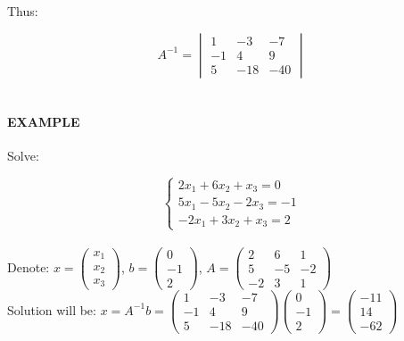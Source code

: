 \documentclass[]{article}
\let\oldparagraph\paragraph
\renewcommand{\paragraph}[1]{\oldparagraph{#1}\mbox{}}
\begin{document}
Thus:\\
 \hspace{2cm}

\[A^{-1}=\begin{vmatrix} 1 &   -3 &   -7\\ -1 &   4 &   9 \\ 5 &   -18 &   -40 \end{vmatrix}\]\\
 \newpage

\paragraph{\texorpdfstring{EXAMPLE\\
}{EXAMPLE }}\label{example-12}

Solve:

\[\begin{cases} 2x_1 + 6x_2 +x_3 = 0\\ 5x_1 - 5x_2 - 2x_3 = -1\\-2x_1 + 3x_2 +x_3 = 2 \end{cases}\]\\

Denote: \(x=\begin{pmatrix} x_1\\ x_2\\ x_3 \end{pmatrix}\),
\(b=\begin{pmatrix} 0\\ -1\\ 2 \end{pmatrix}\),
\(A=\begin{pmatrix} 2 & 6 & 1\\ 5 & -5 & -2 \\ -2 & 3 & 1 \end{pmatrix}\)\\

Solution will be:
\(x = A^{-1}b=\begin{pmatrix} 1 & -3 & -7\\ -1 & 4 & 9 \\ 5 & -18 & -40 \end{pmatrix}\begin{pmatrix} 0\\ -1\\ 2 \end{pmatrix}=\begin{pmatrix} -11\\ 14\\ -62 \end{pmatrix}\)\\
\end{document}
